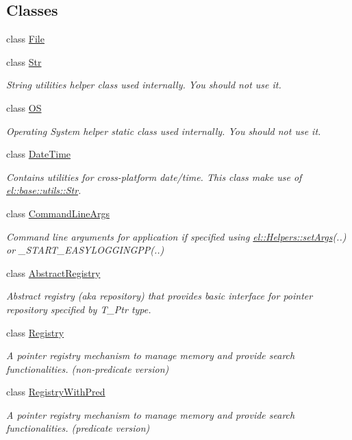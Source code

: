\subsection*{Classes}
\begin{DoxyCompactItemize}
\item 
class \hyperlink{classel_1_1base_1_1utils_1_1File}{File}
\item 
class \hyperlink{classel_1_1base_1_1utils_1_1Str}{Str}
\begin{DoxyCompactList}\small\item\em String utilities helper class used internally. You should not use it. \end{DoxyCompactList}\item 
class \hyperlink{classel_1_1base_1_1utils_1_1OS}{O\-S}
\begin{DoxyCompactList}\small\item\em Operating System helper static class used internally. You should not use it. \end{DoxyCompactList}\item 
class \hyperlink{classel_1_1base_1_1utils_1_1DateTime}{Date\-Time}
\begin{DoxyCompactList}\small\item\em Contains utilities for cross-\/platform date/time. This class make use of \hyperlink{classel_1_1base_1_1utils_1_1Str}{el\-::base\-::utils\-::\-Str}. \end{DoxyCompactList}\item 
class \hyperlink{classel_1_1base_1_1utils_1_1CommandLineArgs}{Command\-Line\-Args}
\begin{DoxyCompactList}\small\item\em Command line arguments for application if specified using \hyperlink{classel_1_1Helpers_a68748f618a0c2840b96dc12532b09bf0}{el\-::\-Helpers\-::set\-Args}(..) or \-\_\-\-S\-T\-A\-R\-T\-\_\-\-E\-A\-S\-Y\-L\-O\-G\-G\-I\-N\-G\-P\-P(..) \end{DoxyCompactList}\item 
class \hyperlink{classel_1_1base_1_1utils_1_1AbstractRegistry}{Abstract\-Registry}
\begin{DoxyCompactList}\small\item\em Abstract registry (aka repository) that provides basic interface for pointer repository specified by T\-\_\-\-Ptr type. \end{DoxyCompactList}\item 
class \hyperlink{classel_1_1base_1_1utils_1_1Registry}{Registry}
\begin{DoxyCompactList}\small\item\em A pointer registry mechanism to manage memory and provide search functionalities. (non-\/predicate version) \end{DoxyCompactList}\item 
class \hyperlink{classel_1_1base_1_1utils_1_1RegistryWithPred}{Registry\-With\-Pred}
\begin{DoxyCompactList}\small\item\em A pointer registry mechanism to manage memory and provide search functionalities. (predicate version) \end{DoxyCompactList}\end{DoxyCompactItemize}
